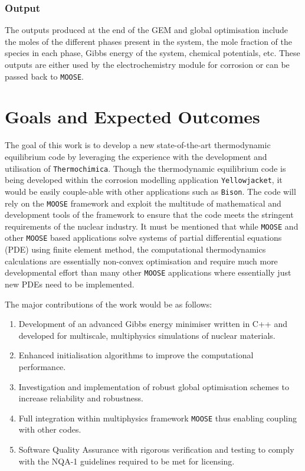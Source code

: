 	\subsubsection*{Output}
    	The outputs produced at the end of the GEM and global optimisation include the moles of the different phases present in the system, the mole fraction of the species in each phase, Gibbs energy of the system, chemical potentials, etc. These outputs are either used by the electrochemistry module for corrosion or can be passed back to \texttt{MOOSE}.
	
\section*{Goals and Expected Outcomes}
The goal of this work is to develop a new state-of-the-art thermodynamic equilibrium code by leveraging the experience with the development and utilisation of \texttt{Thermochimica}. Though the thermodynamic equilibrium code is being developed within the corrosion modelling application \texttt{Yellowjacket}, it would be easily couple-able with other applications such as \texttt{Bison}. The code will rely on the \texttt{MOOSE} framework and exploit the multitude of mathematical and development tools of the framework to ensure that the code meets the stringent requirements of the nuclear industry. It must be mentioned that while \texttt{MOOSE} and other \texttt{MOOSE} based applications solve systems of partial differential equations (PDE) using finite element method, the computational thermodynamics calculations are essentially  non-convex optimisation and require much more developmental effort than many other \texttt{MOOSE} applications where essentially just new PDEs need to be implemented.
	
	The major contributions of the work would be as follows:
	\begin{enumerate}\compresslist
		\item Development of an advanced Gibbs energy minimiser written in C++ and developed for multiscale, multiphysics simulations of nuclear materials.
		\item Enhanced initialisation algorithms to improve the computational performance.
		\item Investigation and implementation of robust global optimisation schemes to increase reliability and robustness.
		\item Full integration within multiphysics framework \texttt{MOOSE} thus enabling coupling with other codes. 
		\item Software Quality Assurance  with rigorous verification and testing to comply with the NQA-1 guidelines required to be met for licensing.
	\end{enumerate}
	
